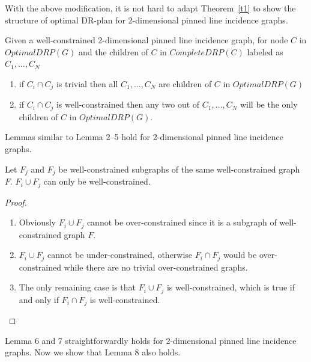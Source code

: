 With the above modification, 
it is not hard to adapt Theorem~\ref{t1} %
to show the structure of optimal DR-plan for 2-dimensional pinned line incidence graphs.


\begin{corollary}
Given a well-constrained 2-dimensional pinned line incidence graph, for node $C$ in $OptimalDRP(G)$ and the children of $C$ in $CompleteDRP(C)$ labeled as $C_1,\ldots,C_N$
\begin{enumerate}
    \item if $C_i \cap C_j$ is trivial then all $C_1,\ldots,C_N$ are children of $C$ in $OptimalDRP(G)$
    \item if $C_i \cap C_j$ is well-constrained then any two out of $C_1,\ldots,C_N$ will be the only children of $C$ in $OptimalDRP(G)$.
\end{enumerate}
\label{cor:pinned}
\end{corollary}

Lemmas similar to Lemma 2--5 hold for 2-dimensional pinned line incidence graphs.

\begin{lemma}
Let $F_j$ and $F_j$ be well-constrained subgraphs of the same well-constrained graph $F$. 
 $F_i \cup F_j$ can only be well-constrained.
\end{lemma}

\begin{proof}
\begin{enumerate}
\item Obviously $F_i \cup F_j$ cannot be over-constrained since it is a subgraph of well-constrained graph $F$.
\item $F_i \cup F_j$ cannot be under-constrained, otherwise $F_i \cap F_j$ would be over-constrained while there are no trivial over-constrained graphs. 
\item The only remaining case is that $F_i \cup F_j$ is well-constrained, which is true if and only if $F_i \cap F_j$ is well-constrained.
\end{enumerate}
\end{proof}

Lemma 6 and 7 straightforwardly holds for 2-dimensional pinned line incidence graphs. 
Now we  show that Lemma 8 also holds. 

